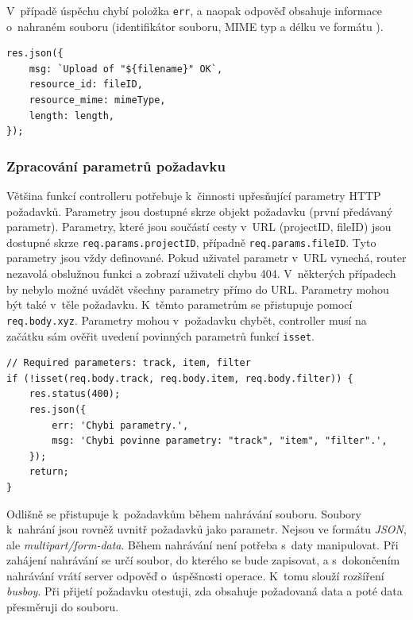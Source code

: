 V~případě úspěchu chybí položka \texttt{err}, a naopak odpověď obsahuje informace o~nahraném souboru (identifikátor souboru, MIME typ a délku ve formátu ).
\begin{lstlisting}[style=JavaScript]
res.json({
    msg: `Upload of "${filename}" OK`,
    resource_id: fileID,
    resource_mime: mimeType,
    length: length,
});
\end{lstlisting}

\subsubsection{Zpracování parametrů požadavku}
Většina funkcí controlleru potřebuje k~činnosti upřesňující parametry HTTP požadavků. Parametry jsou dostupné skrze objekt požadavku (první předávaný parametr). Parametry, které jsou součástí cesty v~URL (projectID, fileID) jsou dostupné skrze \texttt{req.params.projectID}, případně \texttt{req.params.fileID}. Tyto parametry jsou vždy definované. Pokud uživatel parametr v~URL vynechá, router nezavolá obslužnou funkci a zobrazí uživateli chybu 404. V~některých případech by nebylo možné uvádět všechny parametry přímo do URL. Parametry mohou být také v~těle požadavku. K~těmto parametrům se přistupuje pomocí \texttt{req.body.xyz}. Parametry mohou v~požadavku chybět, controller musí na začátku sám ověřit uvedení povinných parametrů funkcí \texttt{isset}.
\begin{lstlisting}[style=JavaScript]
// Required parameters: track, item, filter
if (!isset(req.body.track, req.body.item, req.body.filter)) {
    res.status(400);
    res.json({
        err: 'Chybi parametry.',
        msg: 'Chybi povinne parametry: "track", "item", "filter".',
    });
    return;
}
\end{lstlisting}

Odlišně se přistupuje k~požadavkům během nahrávání souboru. Soubory k~nahrání jsou rovněž uvnitř požadavků jako parametr. Nejsou ve formátu \textit{JSON}, ale \textit{multipart/form-data}. Během nahrávání není potřeba s~daty manipulovat. Při zahájení nahrávání se určí soubor, do kterého se bude zapisovat, a s~dokončením nahrávání vrátí server odpověď o~úspěšnosti operace. K~tomu slouží rozšíření \textit{busboy}. Při přijetí požadavku otestuji, zda obsahuje požadovaná data a poté data přesměruji do souboru.

